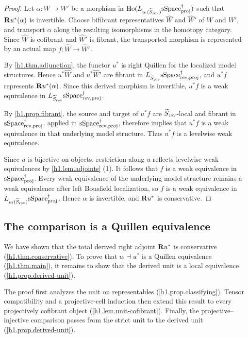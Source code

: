 \documentclass[a4paper,dvipdfmx,11pt]{amsart}
\begin{document}
\begin{proof}
  Let $\alpha:W\to W'$ be a morphism in $\mathrm{Ho}(L_{u_{!}(\widetilde S_{\mathrm{rev}})}\mathrm{sSpace}^{\dag}_{\mathrm{proj}})$ such that $\mathbf{R} u^{*}(\alpha)$ is invertible.
  Choose bifibrant representatives $\widehat W$ and $\widehat W'$ of $W$ and $W'$, and transport $\alpha$ along the resulting isomorphisms in the homotopy category.
  Since $\widehat W$ is cofibrant and $\widehat W'$ is fibrant, the transported morphism is represented by an actual map $f:\widehat W\to\widehat W'$.

  By \cref{h1.thm.adjunction}, the functor $u^{*}$ is right Quillen for the localized model structures.
  Hence $u^{*}\widehat W$ and $u^{*}\widehat W'$ are fibrant in $L_{\widetilde S_{\mathrm{rev}}}\mathrm{sSpace}^{\dag}_{\mathrm{rev},\mathrm{proj}}$, and $u^{*}f$ represents $\mathbf{R} u^{*}(\alpha)$.
  Since this derived morphism is invertible, $u^{*}f$ is a weak equivalence in $L_{\widetilde S_{\mathrm{rev}}}\mathrm{sSpace}^{\dag}_{\mathrm{rev},\mathrm{proj}}$.

  By \cref{h1.prop.fibrant}, the source and target of $u^{*}f$ are $\widetilde S_{\mathrm{rev}}$-local and fibrant in $\mathrm{sSpace}^{\dag}_{\mathrm{rev},\mathrm{proj}}$.
  \Cite[Theorem~3.2.13 (1)]{Hir02} applied in $\mathrm{sSpace}^{\dag}_{\mathrm{rev},\mathrm{proj}}$, therefore implies that $u^{*}f$ is a weak equivalence in that underlying model structure.
  Thus $u^{*}f$ is a levelwise weak equivalence.

  Since $u$ is bijective on objects, restriction along $u$ reflects levelwise weak equivalences by \cref{h1.lem.adjoints} (1).
  It follows that $f$ is a weak equivalence in $\mathrm{sSpace}^{\dag}_{\mathrm{proj}}$.
  Every weak equivalence of the underlying model structure remains a weak equivalence after left Bousfield localization, so $f$ is a weak equivalence in $L_{u_{!}(\widetilde S_{\mathrm{rev}})}\mathrm{sSpace}^{\dag}_{\mathrm{proj}}$.
  Hence $\alpha$ is invertible, and $\mathbf{R} u^{*}$ is conservative.
\end{proof}

\subsection{The comparison is a Quillen equivalence}

We have shown that the total derived right adjoint $\mathbf{R} u^{*}$ is conservative (\cref{h1.thm.conservative}).
To prove that $u_{!}\dashv u^{*}$ is a Quillen equivalence (\cref{h1.thm.main}), it remains to show that the derived unit is a local equivalence (\cref{h1.prop.derived-unit}).

The proof first analyzes the unit on representables (\cref{h1.prop.classifying}).
Tensor compatibility and a projective-cell induction then extend this result to every projectively cofibrant object (\cref{h1.lem.unit-cofibrant}).
Finally, the projective--injective comparison passes from the strict unit to the derived unit (\cref{h1.prop.derived-unit}).
\end{document}
